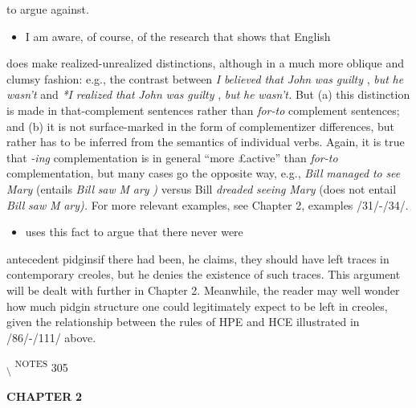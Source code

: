 to argue against.

\begin{itemize}
\item I am aware, of course, of the research that shows that English
\end{itemize}

does make realized-unrealized distinctions, although in a much more oblique and clumsy fashion: e.g., the contrast between \textit{I} \textit{believed} \textit{that} \textit{John} \textit{was} \textit{guilty} , \textit{but} \textit{he} \textit{wasn't} and \textit{*I} \textit{realized} \textit{that} \textit{John} \textit{was} \textit{guilty} , \textit{but} \textit{he} \textit{wasn't.} But (a) this distinction is made in that-complement sentences rather than \textit{for-to} complement sentences; and (b) it is not surface-marked in the form of complementizer differences, but rather has to be inferred from the semantics of individual verbs. Again, it is true that \textit{{}-i}\textit{n}\textit{g} complementation is in general ``more £active'' than \textit{for-to} complementation, but many cases go the opposite way, e.g., \textit{Bill} \textit{managed} \textit{to} \textit{see} \textit{Mary} (entails \textit{Bill} \textit{saw} \textit{M} \textit{ary} \textit{)} versus Bill \textit{dreaded} \textit{seeing} \textit{Mary} (does not entail \textit{Bill} \textit{saw} \textit{M} \textit{ary).} For more relevant exam\-ples, see Chapter 2, examples /31/-/34/.

\begin{itemize}
\item \citet{Alleyne1979} uses this fact to argue that there never were
\end{itemize}

antecedent pidginsif there had been, he claims, they should have left traces in contemporary creoles, but he denies the existence of such traces. This argument will be dealt with further in Chapter 2. Meanwhile, the reader may well wonder how much pidgin structure one could legitimately expect to be left in creoles, given the relation\-ship between the rules of HPE and HCE illustrated in /86/-/111/ above.

\textsubscript{{\textbackslash} }\textsuperscript{NOTES} 305

\textbf{CHAPTER} \textbf{2}

